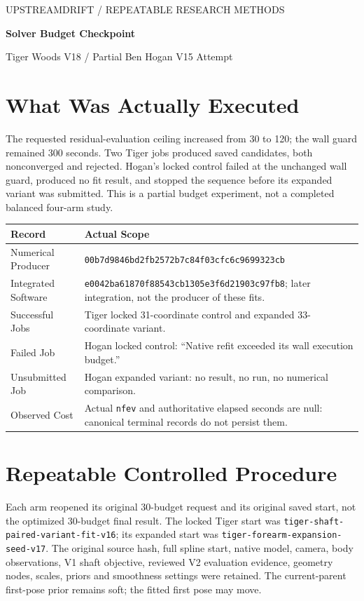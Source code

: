 \documentclass[11pt,letterpaper]{article}
\newcommand{\code}[1]{\nolinkurl{#1}}\newcommand{\hash}[1]{{\footnotesize\nolinkurl{#1}}}
\begin{document}
{\small\textcolor{accent}{UPSTREAMDRIFT / REPEATABLE RESEARCH METHODS}}\par
{\LARGE\bfseries\textcolor{ink}{Solver Budget Checkpoint}}\par
{\large Tiger Woods V18 / Partial Ben Hogan V15 Attempt}\par
\smallskip
\section{What Was Actually Executed}
The requested residual-evaluation ceiling increased from 30 to 120; the wall guard
remained 300 seconds. Two Tiger jobs produced saved candidates, both nonconverged
and rejected. Hogan's locked control failed at the unchanged wall guard, produced
no fit result, and stopped the sequence before its expanded variant was submitted.
This is a partial budget experiment, not a completed balanced four-arm study.

\begin{tabular}{@{}p{.26\linewidth}p{.68\linewidth}@{}}\toprule
Record & Actual Scope\\\midrule
Numerical Producer & \hash{00b7d9846bd2fb2572b7c84f03cfc6c9699323cb}\\
Integrated Software & \hash{e0042ba61870f88543cb1305e3f6d21903c97fb8}; later integration, not the producer of these fits.\\
Successful Jobs & Tiger locked 31-coordinate control and expanded 33-coordinate variant.\\
Failed Job & Hogan locked control: ``Native refit exceeded its wall execution budget.''\\
Unsubmitted Job & Hogan expanded variant: no result, no run, no numerical comparison.\\
Observed Cost & Actual \code{nfev} and authoritative elapsed seconds are null: canonical terminal records do not persist them.\\\bottomrule
\end{tabular}

\section{Repeatable Controlled Procedure}
Each arm reopened its original 30-budget request and its original saved start,
not the optimized 30-budget final result. The locked Tiger start was
\code{tiger-shaft-paired-variant-fit-v16}; its expanded start was
\code{tiger-forearm-expansion-seed-v17}. The original source hash, full spline
start, native model, camera, body observations, V1 shaft objective, reviewed V2
evaluation evidence, geometry nodes, scales, priors and smoothness settings were retained.
The current-parent first-pose prior remains soft; the fitted first pose may move.
\end{document}
